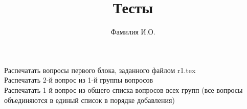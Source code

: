 \documentclass[12pt,a4paper]{article}
\author{Фамилия И.О.}
\title{Тесты}
\begin{document}
\maketitle
\newpage
%
%
%
\newpage
Распечатать вопросы первого блока, заданного файлом r1.tex\\
%
Распечатать 2-й вопрос из 1-й группы вопросов\\
%
Распечатать 1-й вопрос из общего списка вопросов всех групп 
(все вопросы объединяются в единый список в порядке добавления)\\
%
\end{document}
